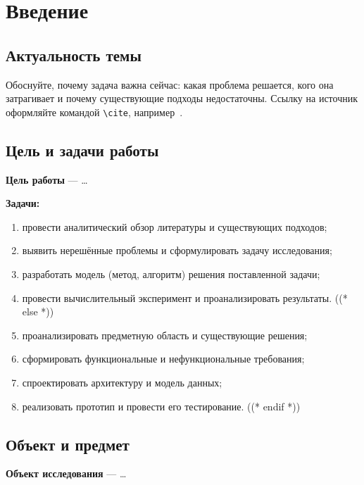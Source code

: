 \documentclass[12pt,a4paper]{extreport}
\begin{document}
\clearpage

\chapter*{Введение}

\section*{Актуальность темы}
Обоснуйте, почему задача важна сейчас: какая проблема решается, кого
она затрагивает и почему существующие подходы недостаточны. Ссылку на
источник оформляйте командой \verb|\cite|, например~\cite{article}.

\section*{Цель и задачи работы}
\textbf{Цель работы} — \ldots\ %

\textbf{Задачи:}
\begin{enumerate}[label=\arabic*), leftmargin=1.25cm]
((* if project.kind == 'research' *))
  \item провести аналитический обзор литературы и существующих подходов;
  \item выявить нерешённые проблемы и сформулировать задачу исследования;
  \item разработать модель (метод, алгоритм) решения поставленной задачи;
  \item провести вычислительный эксперимент и проанализировать результаты.
((* else *))
  \item проанализировать предметную область и существующие решения;
  \item сформировать функциональные и нефункциональные требования;
  \item спроектировать архитектуру и модель данных;
  \item реализовать прототип и провести его тестирование.
((* endif *))
\end{enumerate}

\section*{Объект и предмет}
\textbf{Объект исследования} — \ldots
\end{document}
